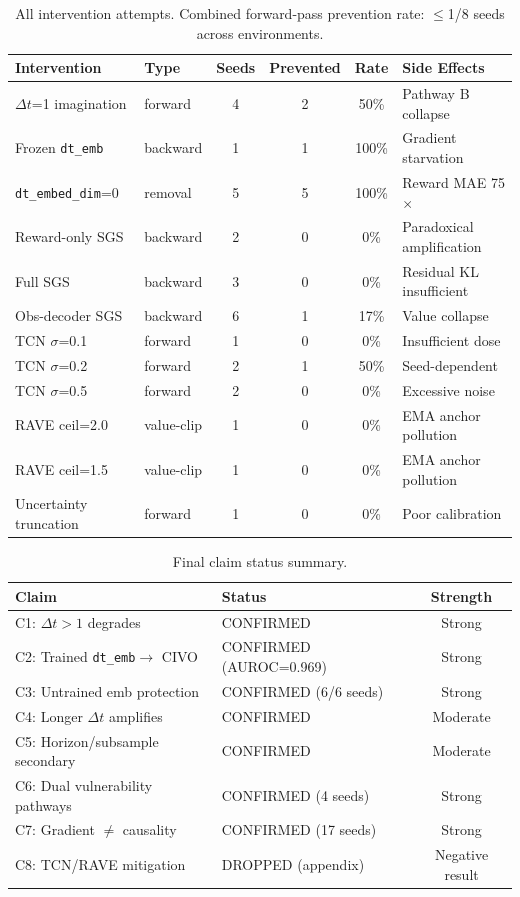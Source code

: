 \documentclass[letterpaper]{article}
\newcommand{\dtemb}{\texttt{dt\_emb}\xspace}
\begin{document}
\begin{table}[h]
\centering
\caption{All intervention attempts. Combined forward-pass prevention rate: $\leq$1/8 seeds across environments.}
\label{tab:all_interventions}
\begin{tabular}{llcccl}
\toprule
Intervention & Type & Seeds & Prevented & Rate & Side Effects \\
\midrule
$\Delta t$=1 imagination & forward & 4 & 2 & 50\% & Pathway B collapse \\
Frozen \dtemb & backward & 1 & 1 & 100\% & Gradient starvation \\
\texttt{dt\_embed\_dim}=0 & removal & 5 & 5 & 100\% & Reward MAE 75$\times$ \\
Reward-only SGS & backward & 2 & 0 & 0\% & Paradoxical amplification \\
Full SGS & backward & 3 & 0 & 0\% & Residual KL insufficient \\
Obs-decoder SGS & backward & 6 & 1 & 17\% & Value collapse \\
TCN $\sigma$=0.1 & forward & 1 & 0 & 0\% & Insufficient dose \\
TCN $\sigma$=0.2 & forward & 2 & 1 & 50\% & Seed-dependent \\
TCN $\sigma$=0.5 & forward & 2 & 0 & 0\% & Excessive noise \\
RAVE ceil=2.0 & value-clip & 1 & 0 & 0\% & EMA anchor pollution \\
RAVE ceil=1.5 & value-clip & 1 & 0 & 0\% & EMA anchor pollution \\
Uncertainty truncation & forward & 1 & 0 & 0\% & Poor calibration \\
\bottomrule
\end{tabular}
\end{table}

\begin{table}[h]
\centering
\caption{Final claim status summary.}
\label{tab:claims_final}
\begin{tabular}{llc}
\toprule
Claim & Status & Strength \\
\midrule
C1: $\Delta t > 1$ degrades & CONFIRMED & Strong \\
C2: Trained \dtemb $\to$ CIVO & CONFIRMED (AUROC=0.969) & Strong \\
C3: Untrained emb protection & CONFIRMED (6/6 seeds) & Strong \\
C4: Longer $\Delta t$ amplifies & CONFIRMED & Moderate \\
C5: Horizon/subsample secondary & CONFIRMED & Moderate \\
C6: Dual vulnerability pathways & CONFIRMED (4 seeds) & Strong \\
C7: Gradient $\neq$ causality & CONFIRMED (17 seeds) & Strong \\
C8: TCN/RAVE mitigation & DROPPED (appendix) & Negative result \\
\bottomrule
\end{tabular}
\end{table}
\end{document}
